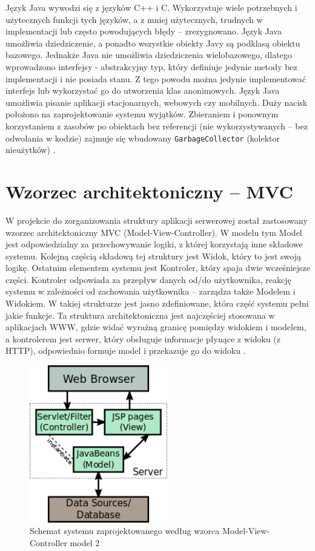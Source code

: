 \documentclass[eng,printmode,oneside]{mgr}
\begin{document}
Język Java wywodzi się z języków C++ i C. Wykorzystuje wiele potrzebnych i
użytecznych funkcji tych języków, a z mniej użytecznych, trudnych w
implementacji lub często powodujących błędy -- zrezygnowano. Język Java
umożliwia dziedziczenie, a ponadto wszystkie obiekty Javy są podklasą obiektu
bazowego. Jednakże Java nie umożliwia dziedziczenia wielobazowego, dlatego wprowadzono interfejsy -
abstrakcyjny typ, który definiuje jedynie metody bez implementacji i nie
posiada stanu. Z tego powodu można jedynie implementować
interfejs lub wykorzystać go do utworzenia klas anonimowych. Język Java
umożliwia pisanie aplikacji stacjonarnych, webowych czy mobilnych. Duży nacisk
położono na zaprojektowanie systemu wyjątków. Zbieraniem i ponownym
korzystaniem z zasobów po obiektach bez referencji (nie wykorzystywanych -- bez
odwołania w kodzie) zajmuje się wbudowany \texttt{GarbageCollector} (kolektor
nieużytków) \cite{java.doc}.

\section{Wzorzec architektoniczny -- MVC}

W projekcie do zorganizowania struktury aplikacji serwerowej został zastosowany
wzorzec architektoniczny MVC (Model-View-Controller). W modelu tym Model jest
odpowiedzialny za przechowywanie logiki, z której korzystają inne składowe
systemu. Kolejną częścią składową tej struktury jest Widok, który to jest
 swoją
logikę. Ostatnim elementem systemu jest Kontroler, który spaja dwie wcześniejsze
części. Kontroler odpowiada za przepływ danych od/do użytkownika, reakcję
systemu w zależności od zachowania użytkownika -- zarządza
także Modelem i Widokiem. W takiej strukturze jest jasno zdefiniowane, która
część systemu pełni jakie funkcje. Ta struktura architektoniczna 
jest najczęściej stosowana w aplikacjach WWW, gdzie widać
wyraźną granicę pomiędzy widokiem i modelem, a kontrolerem jest serwer, który
obsługuje informacje płynące z widoku (z HTTP), odpowiednio formuje model i
przekazuje go do widoku \cite{java.mvc,java.mvc.grafika}.

\begin{figure}[ht!]
\centering
\includegraphics[width=60mm]{jspModel.png}
\caption{Schemat systemu zaprojektowanego według wzorca
Model-View-Controller model 2 \cite{java.mvc.grafika}}
\label{fig:MVC2}
\end{figure}
\end{document}
